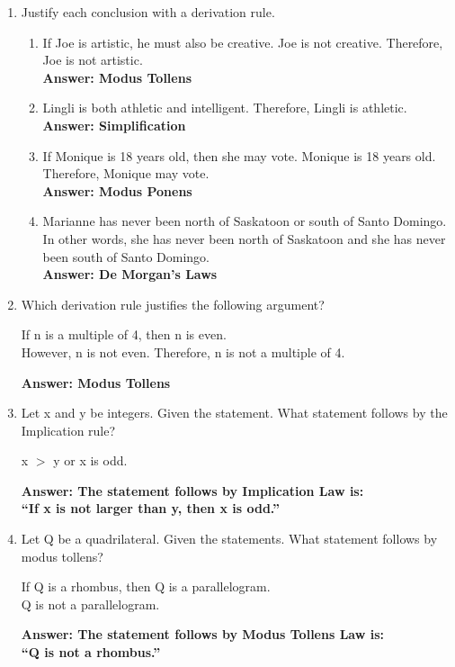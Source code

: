 \documentclass[12pt]{article}
\begin{document}
\begin{enumerate}
\item 
Justify each conclusion with a derivation rule.
  \begin{enumerate}
    \item If Joe is artistic, he must also be creative. Joe is not creative. Therefore, Joe is not artistic.\\
    \textbf{Answer: Modus Tollens}
    \item Lingli is both athletic and intelligent. Therefore, Lingli is athletic.\\
    \textbf{Answer: Simplification}
    \item If Monique is 18 years old, then she may vote. Monique is 18 years old. Therefore, Monique may vote.\\
    \textbf{Answer: Modus Ponens}
    \item Marianne has never been north of Saskatoon or south of Santo Domingo. In other words, she has never been north of Saskatoon and she has never been south of Santo Domingo.\\
    \textbf{Answer: De Morgan's Laws}
  \end{enumerate}

\newpage 
\item Which derivation rule justifies the following argument?
\begin{center}  
  If n is a multiple of 4, then n is even. \\ However, n is not even. Therefore, n is not a multiple of 4.
\end{center} 
\textbf{Answer: Modus Tollens}

\item Let x and y be integers. Given the statement. What statement follows by the Implication rule?
\begin{center}
  x $>$ y or x is odd.
\end{center}
\textbf{Answer: The statement follows by Implication Law is:\\ \textquotedblleft If x is not larger than y, then x is odd.\textquotedblright}

\item Let Q be a quadrilateral. Given the statements. What statement follows by modus tollens?
\begin{center}
  If Q is a rhombus, then Q is a parallelogram.\\
  Q is not a parallelogram.
\end{center}
\textbf{Answer: The statement follows by Modus Tollens Law is: \\ \textquotedblleft Q is not a rhombus.\textquotedblright}


\end{enumerate}
\end{document}
